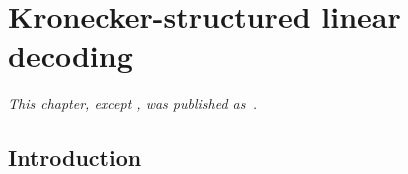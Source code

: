 \chapter{Kronecker-structured linear decoding}
\label{sec:stbf-struct}
\newcommand{\pv}[1]{
	#1
}

  \noindent\emph{This chapter, except
  ,
  was published as~\textcite{VanDenKerchove2022}.}

	\section{Introduction}



